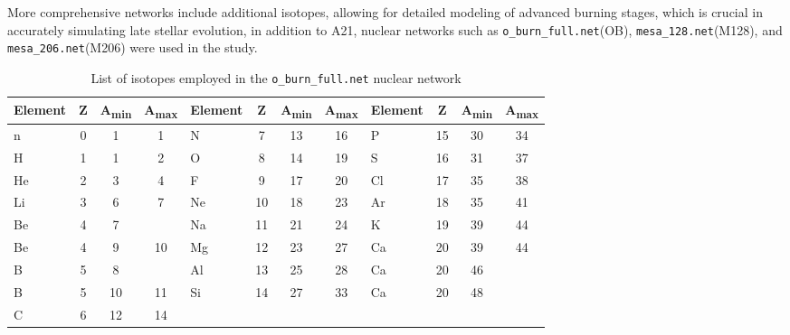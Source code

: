 \vspace{-1em}
\noindent
More comprehensive networks include additional isotopes, allowing for detailed modeling of advanced burning stages, which is crucial in accurately simulating late stellar evolution, in addition to A21, nuclear networks such as \texttt{o\_burn\_full.net}(OB), \texttt{mesa\_128.net}(M128), and \texttt{mesa\_206.net}(M206) were used in the study. 
\begin{table}[h!]
    \centering
    \begin{tabular}{>{\raggedright\arraybackslash}p{1.5cm} c c c | >{\raggedright\arraybackslash}p{1.5cm} c c c | >{\raggedright\arraybackslash}p{1.5cm} c c c}
        \hline\hline
        \textbf{Element} & \textbf{Z} & \textbf{A\textsubscript{min}} & \textbf{A\textsubscript{max}} & \textbf{Element} & \textbf{Z} & \textbf{A\textsubscript{min}} & \textbf{A\textsubscript{max}} & \textbf{Element} & \textbf{Z} & \textbf{A\textsubscript{min}} & \textbf{A\textsubscript{max}} \\
        \hline
        n & 0 & 1 & 1 & N & 7 & 13 & 16 & P & 15 & 30 & 34 \\
        H & 1 & 1 & 2 & O & 8 & 14 & 19 & S & 16 & 31 & 37 \\
        He & 2 & 3 & 4 & F & 9 & 17 & 20 & Cl & 17 & 35 & 38 \\
        Li & 3 & 6 & 7 & Ne & 10 & 18 & 23 & Ar & 18 & 35 & 41 \\
        Be & 4 & 7 & & Na & 11 & 21 & 24 & K & 19 & 39 & 44 \\
        Be & 4 & 9 & 10 & Mg & 12 & 23& 27 & Ca & 20 & 39 & 44 \\
        B & 5 & 8 & & Al & 13 & 25 & 28 & Ca & 20 & 46 & \\
        B & 5 & 10 & 11 & Si & 14 & 27 & 33 & Ca & 20 & 48 & \\
        C & 6 & 12 & 14 & & & & & & & &\\
        \hline
    \end{tabular}
    \caption{List of isotopes employed in the \texttt{o\_burn\_full.net} nuclear network}
    \label{tab:ob}
\end{table}
\vspace{-3em} %

